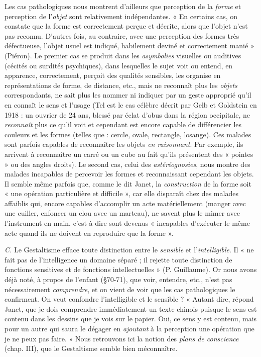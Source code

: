 \vspace{0.24cm}
{\footnotesize 
Les cas pathologiques nous montrent d’ailleurs que perception de la
{\it forme} et perception de l’{\it objet} sont relativement indépendantes. « En certains
cas, on constate que la forme est correctement perçue et décrite, alors que
l’objet n’est pas reconnu. D’autres fois, au contraire, avec une perception
des formes très défectueuse, l’objet usuel est indiqué, habilement deviné
et correctement manié » (Piéron). Le premier cas se produit dans les {\it asymbolies}
visuelles ou auditives (cécités ou surdités psychiques), dans lesquelles le
sujet voit ou entend, en apparence, correctement, perçoit des qualités
sensibles, les organise en représentations de forme, de distance, etc., mais
ne reconnaît plus les {\it objets} correspondants, ne sait plus les nommer ni
indiquer par un geste approprié qu'il en connaît le sens et l’usage
{\scriptsize (Tel est le cas célèbre décrit par Gelb et Goldstein en 1918 : un ouvrier de 24 ans,
blessé par éclat d'obus dans la région occipitale, ne {\it reconnaît} plus ce qu'il voit et
cependant est encore capable de différencier les couleurs et les formes (telles que : cercle,
ovale, rectangle, losange). Ces malades sont parfois capables de reconnaître les objets
{\it en raisonnant}. Par exemple, ils arrivent à reconnaître un carré ou un cube au fait
qu'ils présentent des « pointes » ou des angles droits)}.
Le second
cas, celui des {\it astéréognosies}, nous montre des malades incapables de percevoir
les formes et reconnaissant cependant les objets. Il semble même parfois
que, comme le dit Janet, la {\it construction} de la forme soit « une opération
particulière et difficile », car elle disparaît chez des malades affaiblis qui,
encore capables d'accomplir un acte matériellement (manger avec une
cuiller, enfoncer un clou avec un marteau), ne savent plus le mimer avec
l'instrument en main, c’est-à-dire sont devenus « incapables d’exécuter le
même acte quand ils ne doivent en reproduire que la forme ».}
\vspace{0.31cm}

{\it C.} Le Gestaltisme efface toute distinction entre le {\it sensible} et l’{\it intelligible}.
Il « ne fait pas de l’intelligence un domaine séparé ; il rejette
toute distinction de fonctions sensitives et de fonctions intellectuelles »
(P. Guillaume). Or nous avons déjà noté, à propos de
l'enfant (\S 70-71), que voir, entendre, etc., n’est pas nécessairement
{\it comprendre}, et on vient de voir que les cas pathologiques le confirment.
On veut confondre l’intelligible et le sensible ? « Autant dire, répond
Janet, que je dois comprendre immédiatement un texte chinois
puisque le sens est contenu dans les dessins que je vois sur le papier.
Oui, ce sens y est contenu, mais pour un autre qui saura le dégager
en {\it ajoutant} à la perception une opération que je ne peux pas faire. »
Nous retrouvons ici la notion des {\it plans de conscience} (chap. III), que
le Gestaltisme semble bien méconnaître.

